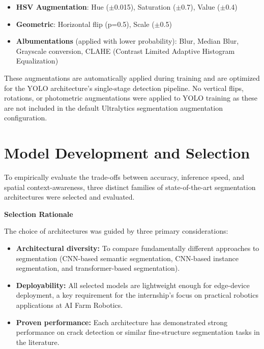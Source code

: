 \begin{itemize}
    \item \textbf{HSV Augmentation}: Hue ($\pm$0.015), Saturation ($\pm$0.7), Value ($\pm$0.4)
    \item \textbf{Geometric}: Horizontal flip (p=0.5), Scale ($\pm$0.5)
    \item \textbf{Albumentations} (applied with lower probability): Blur, Median Blur, Grayscale conversion, CLAHE (Contrast Limited Adaptive Histogram Equalization)
\end{itemize}

\hs These augmentations are automatically applied during training and are optimized for the YOLO architecture's single-stage detection pipeline. No vertical flips, rotations, or photometric augmentations were applied to YOLO training as these are not included in the default Ultralytics segmentation augmentation configuration.

\section{Model Development and Selection}

\hs To empirically evaluate the trade-offs between accuracy, inference speed, and spatial context-awareness, three distinct families of state-of-the-art segmentation architectures were selected and evaluated.

\textbf{Selection Rationale}

The choice of architectures was guided by three primary considerations:

\begin{itemize}
    \item \textbf{Architectural diversity:} To compare fundamentally different approaches to segmentation (CNN-based semantic segmentation, CNN-based instance segmentation, and transformer-based segmentation).
    \item \textbf{Deployability:} All selected models are lightweight enough for edge-device deployment, a key requirement for the internship's focus on practical robotics applications at AI Farm Robotics.
    \item \textbf{Proven performance:} Each architecture has demonstrated strong performance on crack detection or similar fine-structure segmentation tasks in the literature.
\end{itemize}


